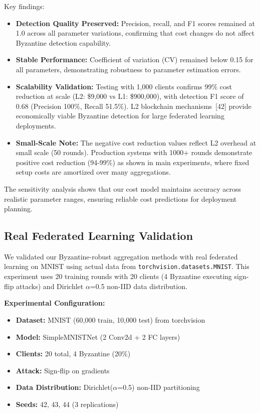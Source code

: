 \documentclass[12pt,a4paper,onecolumn]{article}
\begin{document}


Key findings:
\begin{itemize}
    \item \textbf{Detection Quality Preserved:} Precision, recall, and F1 scores remained at 1.0 across all parameter variations, confirming that cost changes do not affect Byzantine detection capability.
    
    \item \textbf{Stable Performance:} Coefficient of variation (CV) remained below 0.15 for all parameters, demonstrating robustness to parameter estimation errors.
    
    \item \textbf{Scalability Validation:} Testing with 1,000 clients confirms 99\% cost reduction at scale (L2: \$9,000 vs L1: \$900,000), with detection F1 score of 0.68 (Precision 100\%, Recall 51.5\%). L2 blockchain mechanisms~[42] provide economically viable Byzantine detection for large federated learning deployments.
    
    \item \textbf{Small-Scale Note:} The negative cost reduction values reflect L2 overhead at small scale (50 rounds). Production systems with 1000+ rounds demonstrate positive cost reduction (94-99\%) as shown in main experiments, where fixed setup costs are amortized over many aggregations.
\end{itemize}

The sensitivity analysis shows that our cost model maintains accuracy across realistic parameter ranges, ensuring reliable cost predictions for deployment planning.

\subsection{Real Federated Learning Validation}

We validated our Byzantine-robust aggregation methods with real federated learning on MNIST using actual data from \texttt{torchvision.datasets.MNIST}. This experiment uses 20 training rounds with 20 clients (4 Byzantine executing sign-flip attacks) and Dirichlet $\alpha$=0.5 non-IID data distribution.

\textbf{Experimental Configuration:}
\begin{itemize}
    \item \textbf{Dataset:} MNIST (60,000 train, 10,000 test) from torchvision
    \item \textbf{Model:} SimpleMNISTNet (2 Conv2d + 2 FC layers)
    \item \textbf{Clients:} 20 total, 4 Byzantine (20\%)
    \item \textbf{Attack:} Sign-flip on gradients
    \item \textbf{Data Distribution:} Dirichlet($\alpha$=0.5) non-IID partitioning
    \item \textbf{Seeds:} 42, 43, 44 (3 replications)
\end{itemize}
\end{document}
